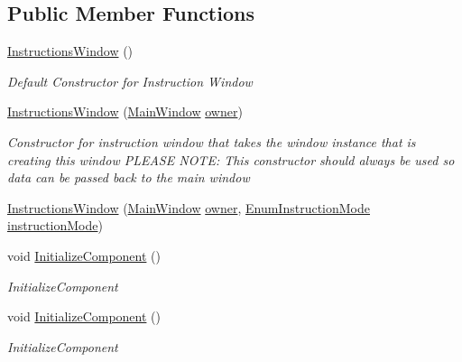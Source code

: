 \subsection*{Public Member Functions}
\begin{DoxyCompactItemize}
\item 
\hyperlink{class_c_p_u___o_s___simulator_1_1_instructions_window_aa482ef12f9c98458bedcc3c07d696879}{Instructions\+Window} ()
\begin{DoxyCompactList}\small\item\em Default Constructor for Instruction Window \end{DoxyCompactList}\item 
\hyperlink{class_c_p_u___o_s___simulator_1_1_instructions_window_a5ed238dc308dcc976400105a3973deb0}{Instructions\+Window} (\hyperlink{class_c_p_u___o_s___simulator_1_1_main_window}{Main\+Window} \hyperlink{class_c_p_u___o_s___simulator_1_1_instructions_window_a954c950c677c61a3b7ed7406b6dc7164}{owner})
\begin{DoxyCompactList}\small\item\em Constructor for instruction window that takes the window instance that is creating this window P\+L\+E\+A\+S\+E N\+O\+T\+E\+: This constructor should always be used so data can be passed back to the main window \end{DoxyCompactList}\item 
\hyperlink{class_c_p_u___o_s___simulator_1_1_instructions_window_afa6f0e58a20268fa56006a775c7959e4}{Instructions\+Window} (\hyperlink{class_c_p_u___o_s___simulator_1_1_main_window}{Main\+Window} \hyperlink{class_c_p_u___o_s___simulator_1_1_instructions_window_a954c950c677c61a3b7ed7406b6dc7164}{owner}, \hyperlink{namespace_c_p_u___o_s___simulator_adc17a5a5e004084f05dc8e4d3f70e31f}{Enum\+Instruction\+Mode} \hyperlink{class_c_p_u___o_s___simulator_1_1_instructions_window_aae7addf8e362e26e981b36b9940a53c0}{instruction\+Mode})
\item 
void \hyperlink{class_c_p_u___o_s___simulator_1_1_instructions_window_a8ad79899f3d5210d66fb5973b721895a}{Initialize\+Component} ()
\begin{DoxyCompactList}\small\item\em Initialize\+Component \end{DoxyCompactList}\item 
void \hyperlink{class_c_p_u___o_s___simulator_1_1_instructions_window_a8ad79899f3d5210d66fb5973b721895a}{Initialize\+Component} ()
\begin{DoxyCompactList}\small\item\em Initialize\+Component \end{DoxyCompactList}\end{DoxyCompactItemize}
